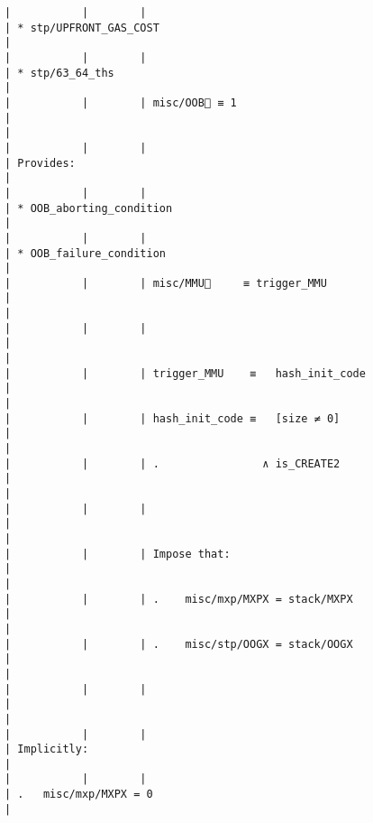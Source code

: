 \documentclass[varwidth=\maxdimen,margin=0.5cm,multi={verbatim}]{standalone}
\begin{document}
\begin{verbatim}
|           |        |                                                      | * stp/UPFRONT_GAS_COST                                              |
|           |        |                                                      | * stp/63_64_ths                                                     |
|           |        | misc/OOB🚩 ≡ 1                                       |                                                                     |
|           |        |                                                      | Provides:                                                           |
|           |        |                                                      | * OOB_aborting_condition                                            |
|           |        |                                                      | * OOB_failure_condition                                             |
|           |        | misc/MMU🚩     ≡ trigger_MMU                         |                                                                     |
|           |        |                                                      |                                                                     |
|           |        | trigger_MMU    ≡   hash_init_code                    |                                                                     |
|           |        | hash_init_code ≡   [size ≠ 0]                        |                                                                     |
|           |        | .                ∧ is_CREATE2                        |                                                                     |
|           |        |                                                      |                                                                     |
|           |        | Impose that:                                         |                                                                     |
|           |        | .    misc/mxp/MXPX = stack/MXPX                      |                                                                     |
|           |        | .    misc/stp/OOGX = stack/OOGX                      |                                                                     |
|           |        |                                                      |                                                                     |
|           |        |                                                      | Implicitly:                                                         |
|           |        |                                                      | .   misc/mxp/MXPX = 0                                               |

\end{verbatim}
\end{document}
